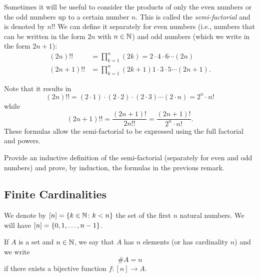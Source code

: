   Sometimes it will be useful to consider the products of only the even numbers
  or the odd numbers up to a certain number $n$. This
  is called the \emph{semi-factorial}%
%
 and is denoted by $n!!$
  We can define it separately for even numbers (i.e., 
  numbers that can be written in the form $2n$ with $n\in {\mathbb N}$)
  and odd numbers (which we write in the form $2n+1$):
  \begin{align*}
    (2n)!! &= \prod_{k=1}^n (2k) = 2 \cdot 4 \cdot 6 \cdots (2n) \\
    (2n+1)!! &= \prod_{k=1}^n (2k+1)1 \cdot 3 \cdot 5 \cdots (2n+1).
  \end{align*}
  
  \begin{remark}
  \label{rem:doppio_fattoriale}%
  Note that it results in
  \[
    (2n)!! = (2\cdot 1) \cdot (2\cdot 2) \cdot (2\cdot 3) \cdots (2\cdot n)
          = 2^n \cdot n!
  \]
  while
  \[
    (2n+1)!! = \frac{(2n+1)!}{2n!!} = \frac{(2n+1)!}{2^n\cdot n!}.
  \]
  These formulas allow the semi-factorial to be expressed using
  the full factorial and powers.
  \end{remark}
  
\begin{exercise}
  Provide an inductive definition of the semi-factorial
  (separately for even and odd numbers)
  and prove, by induction, the formulas in the previous remark.
\end{exercise}

\subsection{Finite Cardinalities}

We denote by $[n] = {\left\{ k\in {\mathbb N}\colon k<n \right\}}$
the set of the first $n$ natural numbers.
We will have $[n]={\left\{ 0,1,\dots, n-1 \right\}}$.

\begin{definition}
If $A$ is a set and $n\in {\mathbb N}$, we say that 
$A$ has $n$ elements (or has cardinality $n$) and we write 
%
\[
  \#A = n
\]
if there exists a bijective function $f\colon [n]\to A$.
\end{definition}

